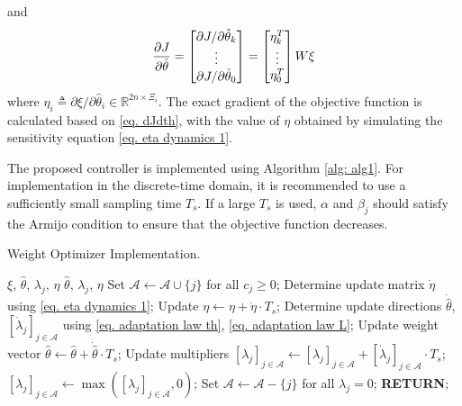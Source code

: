 \documentclass[lettersize,journal]{IEEEtran}
\begin{document}
and
\begin{equation*}\label{eq. grad_J}
    {\partial J\over\partial\hat\theta}
    =
    \begin{bmatrix}
        \partial J/\partial\hat\theta_k\\\vdots\\\partial J/\partial\hat\theta_0\\
    \end{bmatrix}    =
    \begin{bmatrix}
        \eta_k^T\\\vdots\\\eta_0^T\\
    \end{bmatrix}
    W
    \xi
\end{equation*}
where $\eta_i \triangleq \partial \xi/\partial \hat\theta_i\in\mathbb R^{2n\times \Xi_i}$. The exact gradient of the objective function is calculated based on \eqref{eq. dJdth}, with the value of $\eta$ obtained by simulating the sensitivity equation \eqref{eq. eta dynamics 1}.

The proposed controller is implemented using Algorithm \ref{alg: alg1}. For implementation in the discrete-time domain, it is recommended to use a sufficiently small sampling time $T_s$. If a large $T_s$ is used, $\alpha$ and $\beta_j$ should satisfy the Armijo condition \cite[Chap.~3 eq.~(3.4)]{RN22} to ensure that the objective function decreases.

\begin{algorithm}[!t]
    \caption{Weight Optimizer Implementation.}\label{alg: alg1}
    \begin{algorithmic}[1]
        \renewcommand{\algorithmicrequire}{\textbf{Input:}}
        \renewcommand{\algorithmicensure}{\textbf{Output:}}
        \REQUIRE $\xi$, $\hat\theta$, $\lambda_j$, $\eta$
        \ENSURE  $\hat\theta$, $\lambda_j$, $\eta$
        \STATE Set $\mathcal A \leftarrow \mathcal A\cup \{j\}$ for all $c_j\ge0$;
        \STATE Determine update matrix $\dot\eta$ using \eqref{eq. eta dynamics 1};
        \STATE Update $\eta\leftarrow \eta +\dot\eta\cdot T_s$; 
        \STATE Determine update directions $\dot{\hat\theta}$, $[\dot\lambda_j]_{j\in\mathcal A}$ using \eqref{eq. adaptation law th}, \eqref{eq. adaptation law L};
        \STATE Update weight vector $\hat\theta\leftarrow \hat\theta+\dot{\hat\theta}\cdot T_s$;
        \STATE Update multipliers $[\lambda_j]_{j\in\mathcal A}\leftarrow [\lambda_j]_{j\in\mathcal A}+[\dot\lambda_j]_{j\in\mathcal A}\cdot T_s$;
        \STATE $[\lambda_j]_{j\in\mathcal A}\leftarrow \max([\lambda_j]_{j\in\mathcal A}, 0)$;
        \STATE Set $\mathcal A \leftarrow \mathcal A - \{j\}$ for all $\lambda_j=0$;
        \STATE \textbf{RETURN};
    \end{algorithmic}
    \label{alg1}
\end{algorithm}
\end{document}
